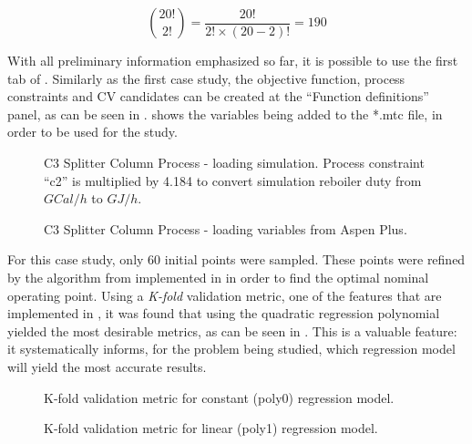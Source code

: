 \documentclass[../../msc-thesis.tex]{subfiles}
\begin{document}
\begin{equation}
    \binom{20!}{2!} = \frac{20!}{2!\times(20-2)!} = 190
    \label{eq:c3splitterpossible}
\end{equation}

With all preliminary information emphasized so far, it is possible to 
use the first tab of \mtc. Similarly as the first case study, the objective 
function, process constraints and CV candidates can be created at the 
``Function definitions'' panel, as can be seen in . 
 shows the variables being added to the *.mtc 
file, in order to be used for the study.

\begin{figure}[htb]
    \centering
    \caption{C3 Splitter Column Process - loading simulation. Process 
    constraint ``c2'' is multiplied by 4.184 to convert simulation reboiler 
    duty from $GCal/h$ to $GJ/h$.}
    \label{fig:c3splitterload}
\end{figure}

\begin{figure}[htb]
    \centering
    \caption{C3 Splitter Column Process - loading variables from Aspen Plus.}
    \label{fig:c3splitterloadvar}
\end{figure}

For this case study, only 60 initial points were sampled. These points were 
refined by the algorithm from \textcite{Caballero2008} implemented in \mtc in 
order to find the optimal nominal operating point. Using a \textit{K-fold} 
validation metric, one of the features that are implemented in \mtc, it was 
found that using the quadratic regression polynomial yielded the most 
desirable metrics, as can be seen in 
. This is a valuable feature: 
it systematically informs, for the problem being studied, which regression 
model will yield the most accurate results.

\begin{figure}[htb]
    \centering
    \caption{K-fold validation metric for constant (poly0) regression model.}
    \label{fig:c3splitterpoly0}
\end{figure}

\begin{figure}[htb]
    \centering
    \caption{K-fold validation metric for linear (poly1) regression model.}
    \label{fig:c3splitterpoly1}
\end{figure}
\end{document}
